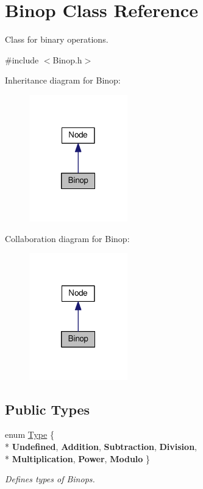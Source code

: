 \hypertarget{classBinop}{}\section{Binop Class Reference}
\label{classBinop}


Class for binary operations.  




{\ttfamily \#include $<$Binop.\+h$>$}



Inheritance diagram for Binop\+:\nopagebreak
\begin{figure}[H]
\begin{center}
\leavevmode
\includegraphics[width=121pt]{classBinop__inherit__graph}
\end{center}
\end{figure}


Collaboration diagram for Binop\+:\nopagebreak
\begin{figure}[H]
\begin{center}
\leavevmode
\includegraphics[width=121pt]{classBinop__coll__graph}
\end{center}
\end{figure}
\subsection*{Public Types}
\begin{DoxyCompactItemize}
\item 
\hypertarget{classBinop_a833e85c431d85ca69758bfebec9193dc}{}enum \hyperlink{classBinop_a833e85c431d85ca69758bfebec9193dc}{Type} \{ \\*
{\bfseries Undefined}, 
{\bfseries Addition}, 
{\bfseries Subtraction}, 
{\bfseries Division}, 
\\*
{\bfseries Multiplication}, 
{\bfseries Power}, 
{\bfseries Modulo}
 \}\label{classBinop_a833e85c431d85ca69758bfebec9193dc}

\begin{DoxyCompactList}\small\item\em Defines types of Binops. \end{DoxyCompactList}\end{DoxyCompactItemize}
